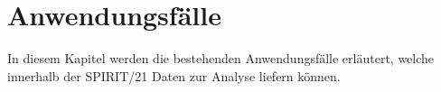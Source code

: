 \chapter{Anwendungsfälle}
In diesem Kapitel werden die bestehenden Anwendungsfälle erläutert, welche innerhalb der \mbox{SPIRIT/21} Daten zur Analyse liefern können.











